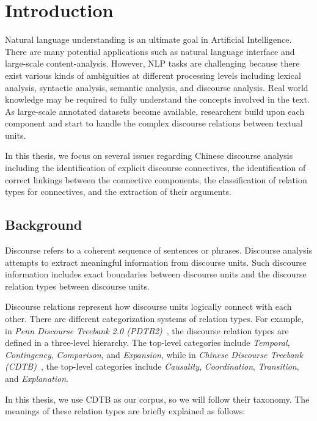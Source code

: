 %
%
%
\chapter{Introduction}
\label{c:intro}

Natural language understanding is an ultimate goal in Artificial
Intelligence. There are many potential applications such as natural language
interface and large-scale content-analysis. However, NLP tasks are
challenging because there exist various kinds of ambiguities at different processing levels
including lexical analysis, syntactic analysis, semantic analysis, and discourse analysis.
Real world knowledge may be required to fully understand the concepts involved in the text.
As large-scale annotated datasets become available, researchers build upon each
component and start to handle the complex discourse relations between textual units.

In this thesis, we focus on several issues regarding Chinese discourse analysis
including the identification of explicit discourse connectives,
the identification of correct linkings between the connective components,
the classification of relation types for connectives,
and the extraction of their arguments.

%
%
\section{Background}

Discourse refers to a coherent sequence of sentences or phrases.
Discourse analysis attempts to extract meaningful information from
discourse units. Such discourse information includes exact boundaries
between discourse units and the discourse relation types between
discourse units.

Discourse relations represent how discourse units logically connect
with each other. There are different categorization systems of relation types.
For example, in
\textit{Penn Discourse Treebank 2.0 (PDTB2)}~\citep{Prasad08thepenn}, the discourse
relation types are defined in a three-level hierarchy. The top-level categories
include \textit{Temporal}, \textit{Contingency}, \textit{Comparison},
and \textit{Expansion}, while in
\textit{Chinese Discourse Treebank (CDTB)}~\citep{li2014building},
the top-level categories include \textit{Causality}, \textit{Coordination},
\textit{Transition}, and \textit{Explanation}.

In this thesis, we use CDTB as our corpus, so we will follow their taxonomy.
The meanings of these relation types are briefly explained as follows:

